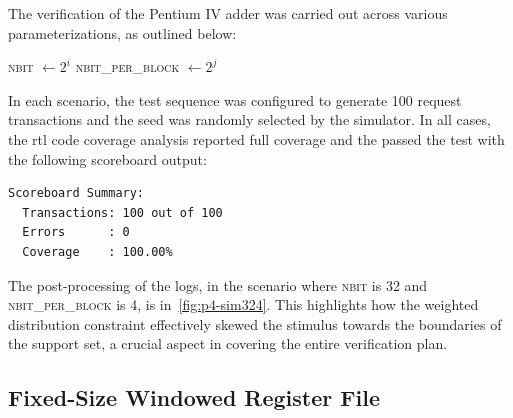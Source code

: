 The verification of the Pentium IV adder was carried out across various parameterizations, as outlined below:
\begin{algorithmic}
        \State \textsc{nbit} $\gets 2^i$
            \State \textsc{nbit\_per\_block} $\gets 2^j$
    \EndFor
\EndFor
\end{algorithmic}
In each scenario, the test sequence was configured to generate 100 request transactions and the seed was randomly selected by the simulator. In all cases, the \ac{rtl} code coverage analysis reported full coverage and the \dut passed the test with the following scoreboard output:
\begin{verbatim}
Scoreboard Summary:
  Transactions: 100 out of 100
  Errors      : 0
  Coverage    : 100.00%
\end{verbatim}

The post-processing of the logs, in the scenario where \textsc{nbit} is 32 and \textsc{nbit\_per\_block} is 4, is in~\cref{fig:p4-sim324}. This highlights how the weighted distribution constraint effectively skewed the stimulus towards the boundaries of the support set, a crucial aspect in covering the entire verification plan.

\subsection{Fixed-Size Windowed Register File}

